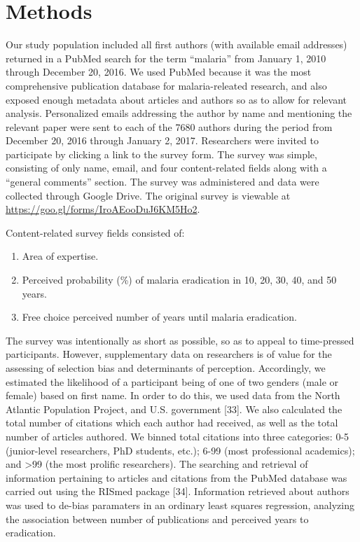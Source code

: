 \documentclass[]{article}
\providecommand{\tightlist}{%
  \setlength{\itemsep}{0pt}\setlength{\parskip}{0pt}}
\begin{document}
\section{Methods}\label{methods}

Our study population included all first authors (with available email
addresses) returned in a PubMed search for the term ``malaria'' from
January 1, 2010 through December 20, 2016. We used PubMed because it was
the most comprehensive publication database for malaria-releated
research, and also exposed enough metadata about articles and authors so
as to allow for relevant analysis. Personalized emails addressing the
author by name and mentioning the relevant paper were sent to each of
the 7680 authors during the period from December 20, 2016 through
January 2, 2017. Researchers were invited to participate by clicking a
link to the survey form. The survey was simple, consisting of only name,
email, and four content-related fields along with a ``general comments''
section. The survey was administered and data were collected through
Google Drive. The original survey is viewable at
\url{https://goo.gl/forms/IroAEooDuJ6KM5Ho2}.

Content-related survey fields consisted of:

\begin{enumerate}
\def\labelenumi{\arabic{enumi}.}
\tightlist
\item
  Area of expertise.
\item
  Perceived probability (\%) of malaria eradication in 10, 20, 30, 40,
  and 50 years.
\item
  Free choice perceived number of years until malaria eradication.
\end{enumerate}

The survey was intentionally as short as possible, so as to appeal to
time-pressed participants. However, supplementary data on researchers is
of value for the assessing of selection bias and determinants of
perception. Accordingly, we estimated the likelihood of a participant
being of one of two genders (male or female) based on first name. In
order to do this, we used data from the North Atlantic Population
Project, and U.S. government {[}33{]}. We also calculated the total
number of citations which each author had received, as well as the total
number of articles authored. We binned total citations into three
categories: 0-5 (junior-level researchers, PhD students, etc.); 6-99
(most professional academics); and \textgreater{}99 (the most prolific
researchers). The searching and retrieval of information pertaining to
articles and citations from the PubMed database was carried out using
the RISmed package {[}34{]}. Information retrieved about authors was
used to de-bias paramaters in an ordinary least squares regression,
analyzing the association between number of publications and perceived
years to eradication.
\end{document}
